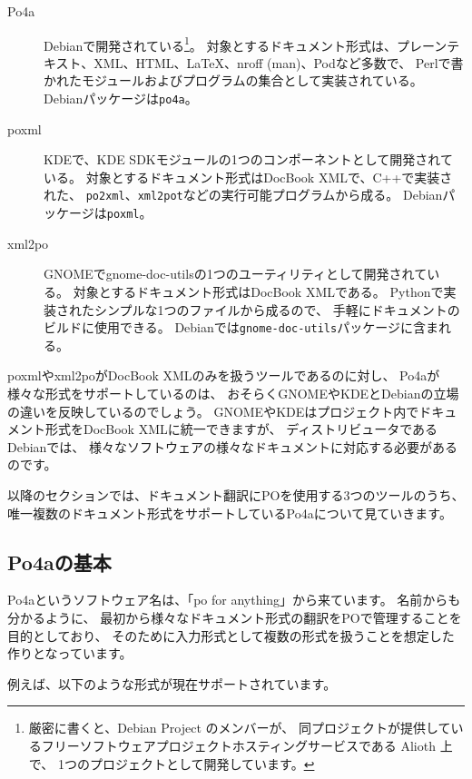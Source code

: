 \documentclass[mingoth,a4paper]{jsarticle}
\begin{document}
\begin{description}
 \item[Po4a] Debianで開発されている\footnote{厳密に書くと、Debian Project のメンバーが、
	    同プロジェクトが提供しているフリーソフトウェアプロジェクトホスティングサービスである Alioth 上で、
	    1つのプロジェクトとして開発しています。}。
	    対象とするドキュメント形式は、プレーンテキスト、XML、HTML、LaTeX、nroff (man)、Podなど多数で、
	    Perlで書かれたモジュールおよびプログラムの集合として実装されている。
	    Debianパッケージは\texttt{po4a}。
 \item[poxml] KDEで、KDE SDKモジュールの1つのコンポーネントとして開発されている。
	    対象とするドキュメント形式はDocBook XMLで、C++で実装された、
	    \texttt{po2xml}、\texttt{xml2pot}などの実行可能プログラムから成る。
	    Debianパッケージは\texttt{poxml}。
 \item[xml2po] GNOMEでgnome-doc-utilsの1つのユーティリティとして開発されている。
	    対象とするドキュメント形式はDocBook XMLである。
	    Pythonで実装されたシンプルな1つのファイルから成るので、
	    手軽にドキュメントのビルドに使用できる。
	    Debianでは\texttt{gnome-doc-utils}パッケージに含まれる。
\end{description}

poxmlやxml2poがDocBook XMLのみを扱うツールであるのに対し、
Po4aが様々な形式をサポートしているのは、
おそらくGNOMEやKDEとDebianの立場の違いを反映しているのでしょう。
GNOMEやKDEはプロジェクト内でドキュメント形式をDocBook XMLに統一できますが、
ディストリビュータであるDebianでは、
様々なソフトウェアの様々なドキュメントに対応する必要があるのです。

以降のセクションでは、ドキュメント翻訳にPOを使用する3つのツールのうち、
唯一複数のドキュメント形式をサポートしているPo4aについて見ていきます。

\subsection{Po4aの基本}

Po4aというソフトウェア名は、「po for anything」から来ています。
名前からも分かるように、
最初から様々なドキュメント形式の翻訳をPOで管理することを目的としており、
そのために入力形式として複数の形式を扱うことを想定した作りとなっています。

例えば、以下のような形式が現在サポートされています。
\end{document}

